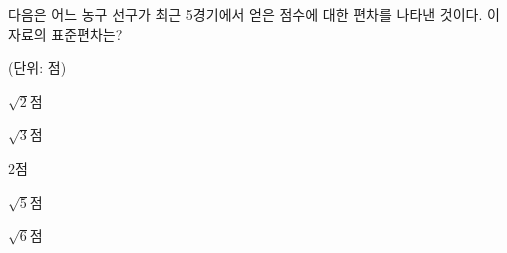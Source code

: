 다음은 어느 농구 선구가 최근 5경기에서 얻은 점수에 대한 편차를 나타낸 것이다. 이 자료의 표준편차는?\par\noindent\hfill{\footnotesize (단위: 점)}
\begin{choices32}{\rule[-3ex]{0pt}{8ex}$\sqrt{2}$점}{\rule[-3ex]{0pt}{8ex}$\sqrt{3}$점}{\rule[-3ex]{0pt}{8ex}$2$점}{\rule[-3ex]{0pt}{8ex}$\sqrt{5}$점}{\rule[-3ex]{0pt}{8ex}$\sqrt{6}$점}\end{choices32}
